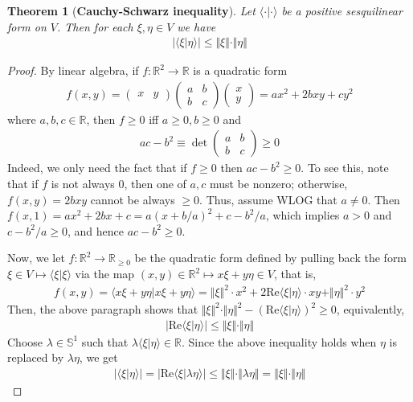 \documentclass[12pt,b5paper,notitlepage]{article}
\theoremstyle{definition}
\theoremstyle{plain}
\newtheorem{thm}[df]{Theorem}
\newcommand{\bk}[1]{\langle {#1}\rangle}
\newcommand{\Rbb}{\mathbb R}
\newcommand{\Sbb}{{\mathbb S}}
\newcommand{\Real}{\mathrm{Re}}
\numberwithin{equation}{section}
\begin{document}
\begin{thm}[\textbf{Cauchy-Schwarz inequality}] \label{lb165}
Let $\bk{\cdot|\cdot}$ be a positive sesquilinear form on $V$. Then for each $\xi,\eta\in V$ we have
\begin{align*}
|\bk{\xi|\eta}|\leq\Vert \xi\Vert\cdot\Vert \eta\Vert
\end{align*}
\end{thm}

\begin{proof}
By linear algebra, if $f:\Rbb^2\rightarrow\Rbb$ is a quadratic form
\begin{align*}
f(x,y)=\begin{pmatrix}
x&y
\end{pmatrix}\begin{pmatrix}
a&b\\
b&c
\end{pmatrix}
\begin{pmatrix}
x\\
y
\end{pmatrix}
=ax^2+2bxy+cy^2
\end{align*}
where $a,b,c\in\Rbb$, then $f\geq0$ iff $a\geq0,b\geq0$ and
\begin{align*}
ac-b^2\equiv\det\begin{pmatrix}
a&b\\
b&c
\end{pmatrix}\geq0
\end{align*}
Indeed, we only need the fact that if $f\geq0$ then $ac-b^2\geq0$. To see this, note that if $f$ is not always $0$, then one of $a,c$ must be nonzero; otherwise, $f(x,y)=2bxy$ cannot be always $\geq0$. Thus, assume WLOG that $a\neq0$. Then $f(x,1)=ax^2+2bx+c=a(x+b/a)^2+c-b^2/a$, which implies $a>0$ and $c-b^2/a\geq0$, and hence $ac-b^2\geq0$.

Now, we let $f:\Rbb^2\rightarrow\Rbb_{\geq0}$ be the quadratic form defined by pulling back the form $\xi\in V\mapsto\bk{\xi|\xi}$ via the map $(x,y)\in\Rbb^2\mapsto x\xi+y\eta\in V$, that is,
\begin{align*}
f(x,y)=\bk{x\xi+y\eta|x\xi+y\eta}=\Vert \xi\Vert^2\cdot x^2+2\Real\bk{\xi|\eta}\cdot xy+\Vert \eta\Vert^2\cdot y^2
\end{align*}
Then, the above paragraph shows that $\Vert \xi\Vert^2\cdot\Vert \eta\Vert^2-(\Real\bk{\xi|\eta})^2\geq0$, equivalently,
\begin{align*}
|\Real\bk{\xi|\eta}|\leq \Vert \xi\Vert\cdot\Vert \eta\Vert
\end{align*}
Choose $\lambda\in\Sbb^1$ such that $\lambda\bk{\xi|\eta}\in\Rbb$. Since the above inequality holds when $\eta$ is replaced by $\lambda \eta$, we get
\begin{align*}
|\bk{\xi|\eta}|=|\Real\bk{\xi|\lambda \eta}|\leq\Vert \xi\Vert\cdot\Vert \lambda \eta\Vert=\Vert \xi\Vert\cdot\Vert \eta\Vert
\end{align*}
\end{proof}
\end{document}
